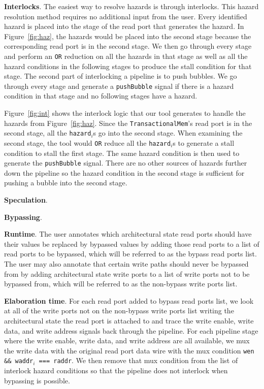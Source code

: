 {\bf Interlocks}. The easiest way to resolve
hazards is through interlocks. This hazard resolution method requires
no additional input from the user. Every identified hazard is placed
into the stage of the read port that generates the hazard. In
Figure~\ref{fig:haz}, the hazards would be placed into the second
stage because the corresponding read port is in the second stage. We
then go through every stage and perform an {\tt OR} reduction on all
the hazards in that stage as well as all the hazard conditions in the
following stages to produce the stall condition for that stage. The
second part of interlocking a pipeline is to push bubbles. We go
through every stage and generate a {\tt pushBubble} signal if there is
a hazard condition in that stage and no following stages have a
hazard.

Figure~\ref{fig:int} shows the interlock logic that our tool
generates to handle the hazards from Figure~\ref{fig:haz}. Since
the {\tt TransactionalMem}'s read port is in the second stage, all the
{\tt hazard$_i$}s go into the second stage. When examining the second
stage, the tool would {\tt OR} reduce all the {\tt hazard}$_i$s to
generate a stall condition to stall the first stage. The same hazard
condition is then used to generate the {\tt pushBubble} signal. There
are no other sources of hazards further down the pipeline so the
hazard condition in the second stage is sufficient for pushing a
bubble into the second stage.

{\bf Speculation}.

{\bf Bypassing}. 

{\bf Runtime}. The user annotates which architectural state read ports should have their values be replaced by bypassed values by adding those read ports to a list of read ports to be bypassed, which will be referred to as the bypass read ports list. The user may also annotate that certain write paths should never be bypassed from by adding architectural state write ports to a list of write ports not to be bypassed from, which will be referred to as the non-bypass write ports list.

{\bf Elaboration time}. For each read port added to bypass read ports list, we look at all of the write ports not on the non-bypass write ports list writing the architectural state the read port is attached to and trace the write enable, write data, and write address signals back through the pipeline. For each pipeline stage where the write enable, write data, and write address are all available, we mux the write data with the original read port data wire with the mux condition {\tt wen \&\& waddr$_i$ === raddr}. We then remove that mux condition from the list of interlock hazard conditions so that the pipeline does not interlock when bypassing is possible.
